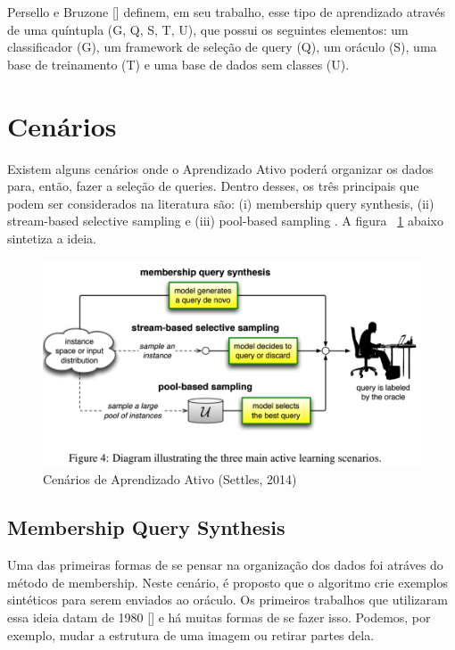 Persello e Bruzone [\cite{persello2012active}] definem, em seu trabalho, esse tipo de aprendizado através de uma quíntupla (G, Q, S, T, U), que possui os seguintes elementos: um classificador (G), um framework de seleção de query (Q), um oráculo (S), uma base de treinamento (T) e uma base de dados sem classes (U). 

\section{Cenários}
\label{sec:cenarios}

Existem alguns cenários onde o Aprendizado Ativo poderá organizar os dados para, então, fazer a seleção de queries. Dentro desses, os três principais que podem ser considerados na literatura são: (i) membership query synthesis, (ii) stream-based selective sampling e (iii) pool-based sampling \cite{settles2014active}. A figura ~\ref{fig:ActiveLearningScenarios} abaixo sintetiza a ideia.


\begin{figure}
  \centering
  \includegraphics[width=.8\textwidth]{figures/active_learning_scenarios.png}
  \caption{Cenários de Aprendizado Ativo (Settles, 2014)}
  \label{fig:ActiveLearningScenarios}
\end{figure}


\subsection{Membership Query Synthesis}
\label{sec:cenarios_membeship}

Uma das primeiras formas de se pensar na organização dos dados foi atráves do método de membership. Neste cenário, é proposto que o algoritmo crie exemplos sintéticos para serem enviados ao oráculo. Os primeiros trabalhos que utilizaram essa ideia datam de 1980 [\cite{shapiro1981algorithm, shapiro1982algorithmic, shapiro198algorithmic_2}] e há muitas formas de se fazer isso. Podemos, por exemplo, mudar a estrutura de uma imagem ou retirar partes dela. 

